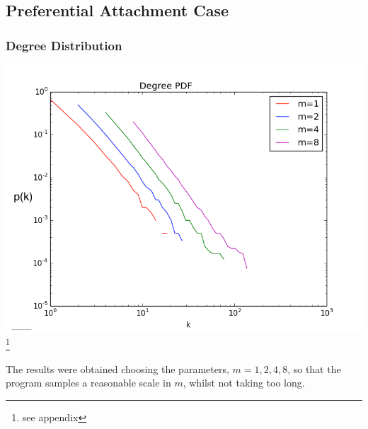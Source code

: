\documentclass[twoside]{article}
\begin{document}
\subsection{Preferential Attachment Case}
\subsubsection{Degree Distribution}

\begin{center}
  \includegraphics[height=100mm]{degree_dist.png}
  \footnote{see appendix}
\end{center}
The results were obtained choosing the parameters, $m=1,2,4,8$, so that the program samples a reasonable scale in $m$, whilst not taking too long.
\end{document}
